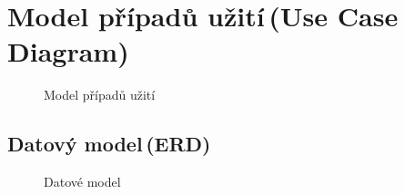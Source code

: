 \documentclass[a4paper,11pt]{article}
\begin{document}
\section{Model případů užití\,(Use Case Diagram)}
\begin{figure}[h]
\caption{Model případů užití}
\label{obrazek:1}
\end{figure}

\newpage
\begin{landscape}
\section{Datový model\,(ERD)}
\begin{figure}[h]
\caption{Datové model}
\label{obrazek:2}
\end{figure}
\end{landscape}
\newpage
\end{document}
